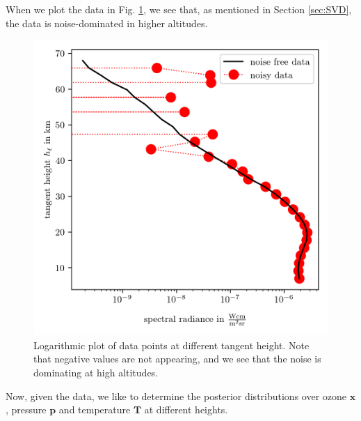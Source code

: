 When we plot the data in Fig. \ref{fig:DataPlot}, we see that, as mentioned in Section \ref{sec:SVD}, the data is noise-dominated in higher altitudes.
\begin{figure}[th!]
	\centering
	\includegraphics{DataPlot.png}
	\caption[Logarithmic plot of data points at different tangent height.]{Logarithmic plot of data points at different tangent height. Note that negative values are not appearing, and we see that the noise is dominating at high altitudes.}
	\label{fig:DataPlot}
\end{figure}
Now, given the data, we like to determine the posterior distributions over ozone $\bm{x}$, pressure $\bm{p}$ and temperature $\bm{T}$ at different heights.
\clearpage


